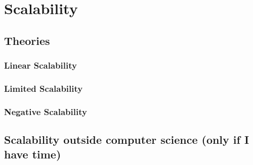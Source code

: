 
\section{Scalability}
  \subsection{Theories}
    \subsubsection{Linear Scalability}
    \subsubsection{Limited Scalability}
    \subsubsection{Negative Scalability}
  \subsection{Scalability outside computer science (only if I have time)}

                                    \endinput




We define a web service as a computer program whose main interface is based on web protocols, such as HTTP.
Such a service uses resources allocated on a network of computers.
Scalability defines the ability of the service to use a certain quantity of resource to meet a desired performance.
We call system the association of the computer program and the available resources. 
The performance of this system is measured by its latency and throughput.

\subsection{Latency and throughput}


